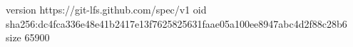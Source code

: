 version https://git-lfs.github.com/spec/v1
oid sha256:dc4fca336e48e41b2417e13f7625825631faae05a100ee8947abc4d2f88c28b6
size 65900
